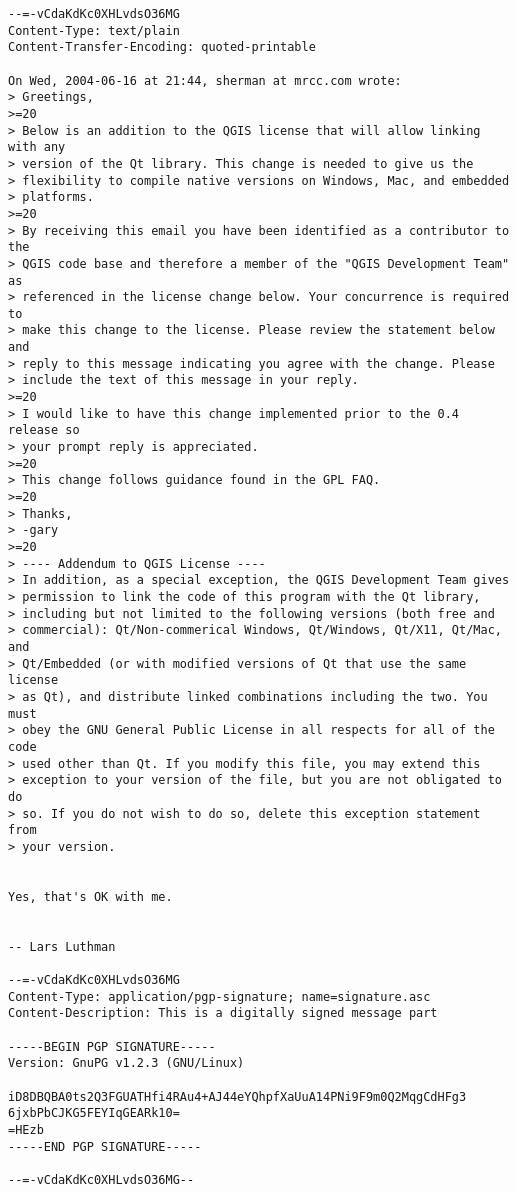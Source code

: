 \begin{small}
\begin{verbatim}
--=-vCdaKdKc0XHLvdsO36MG
Content-Type: text/plain
Content-Transfer-Encoding: quoted-printable

On Wed, 2004-06-16 at 21:44, sherman at mrcc.com wrote:
> Greetings,
>=20
> Below is an addition to the QGIS license that will allow linking with any
> version of the Qt library. This change is needed to give us the
> flexibility to compile native versions on Windows, Mac, and embedded
> platforms.
>=20
> By receiving this email you have been identified as a contributor to the
> QGIS code base and therefore a member of the "QGIS Development Team" as
> referenced in the license change below. Your concurrence is required to
> make this change to the license. Please review the statement below and
> reply to this message indicating you agree with the change. Please
> include the text of this message in your reply.
>=20
> I would like to have this change implemented prior to the 0.4 release so
> your prompt reply is appreciated.
>=20
> This change follows guidance found in the GPL FAQ.
>=20
> Thanks,
> -gary
>=20
> ---- Addendum to QGIS License ----
> In addition, as a special exception, the QGIS Development Team gives
> permission to link the code of this program with the Qt library,
> including but not limited to the following versions (both free and
> commercial): Qt/Non-commerical Windows, Qt/Windows, Qt/X11, Qt/Mac, and
> Qt/Embedded (or with modified versions of Qt that use the same license
> as Qt), and distribute linked combinations including the two. You must
> obey the GNU General Public License in all respects for all of the code
> used other than Qt. If you modify this file, you may extend this
> exception to your version of the file, but you are not obligated to do
> so. If you do not wish to do so, delete this exception statement from
> your version.


Yes, that's OK with me.


-- Lars Luthman

--=-vCdaKdKc0XHLvdsO36MG
Content-Type: application/pgp-signature; name=signature.asc
Content-Description: This is a digitally signed message part

-----BEGIN PGP SIGNATURE-----
Version: GnuPG v1.2.3 (GNU/Linux)

iD8DBQBA0ts2Q3FGUATHfi4RAu4+AJ44eYQhpfXaUuA14PNi9F9m0Q2MqgCdHFg3
6jxbPbCJKG5FEYIqGEARk10=
=HEzb
-----END PGP SIGNATURE-----

--=-vCdaKdKc0XHLvdsO36MG--



\end{verbatim}
\end{small}
